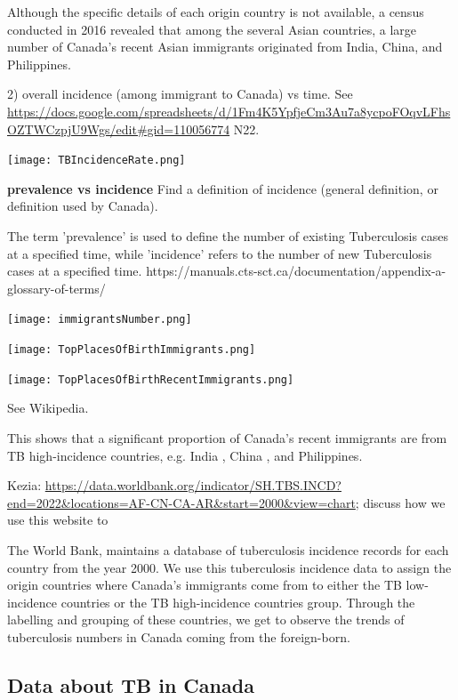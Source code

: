 \documentclass[sn-mathphys,Numbered]{sn-jnl}%
\theoremstyle{thmstyleone}%
\theoremstyle{thmstyletwo}%
\theoremstyle{thmstylethree}%
\begin{document}
Although the specific details of each origin country is not available, a census conducted in 2016 revealed that among the several Asian countries, a large number of Canada’s recent Asian immigrants originated from India, China, and Philippines. 

2) overall incidence (among immigrant to Canada) vs time.  See \url{https://docs.google.com/spreadsheets/d/1Fm4K5YpfjeCm3Au7a8ycpoFOqvLFhsOZTWCzpjU9Wgs/edit#gid=110056774} N22.

\texttt{[image: TBIncidenceRate.png]}

\textbf{prevalence vs incidence}
Find a definition of incidence (general definition, or definition used by Canada).

The term 'prevalence' is used to define the number of existing Tuberculosis cases at a specified time, while 'incidence' refers to the number of new Tuberculosis cases at a specified time.
{https://manuals.cts-sct.ca/documentation/appendix-a-glossary-of-terms/}



\texttt{[image: immigrantsNumber.png]}

\texttt{[image: TopPlacesOfBirthImmigrants.png]}

\texttt{[image: TopPlacesOfBirthRecentImmigrants.png]}

See Wikipedia.

This shows that a significant proportion of Canada’s recent immigrants are from TB high-incidence countries, e.g. India \cite{Varshney2023TrendsPandemic}, China \cite{Yu2020Estimating2025-2050}, and Philippines\cite{Capeding2022Cost2017}.

Kezia: \url{https://data.worldbank.org/indicator/SH.TBS.INCD?end=2022&locations=AF-CN-CA-AR&start=2000&view=chart}; discuss how we use this website to 

The World Bank, maintains a database of tuberculosis incidence records for each country from the year 2000. We use this tuberculosis incidence data to assign the origin countries where Canada's immigrants come from to either the TB low-incidence countries or the TB high-incidence countries group. Through the labelling and grouping of these countries, we get to observe the trends of tuberculosis numbers in Canada coming from the foreign-born.


\subsection{Data about TB in Canada}
\end{document}
